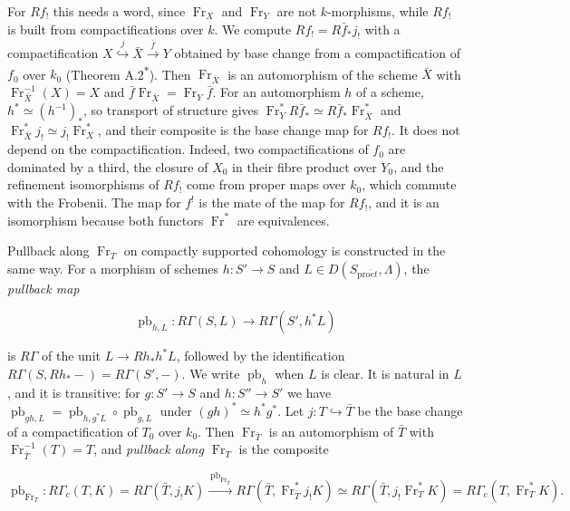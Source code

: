 \documentclass[11pt]{article}
\newcommand{\bpout}[1]{#1\textsuperscript{\hyperlink{bp-outside}{\ensuremath{\ast}}}}
\begin{document}
For \(Rf_!\) this needs a word, since \(\operatorname{Fr}_X\) and \(\operatorname{Fr}_Y\) are not \(k\)-morphisms, while \(Rf_!\) is built from compactifications over \(k\). We compute \(Rf_!=R\bar f_*j_!\) with a compactification \(X\overset{j}{\hookrightarrow}\bar X\xrightarrow{\bar f}Y\) obtained by base change from a compactification of \(f_0\) over \(k_0\) (Theorem \bpout{A.2}). Then \(\operatorname{Fr}_{\bar X}\) is an automorphism of the scheme \(\bar X\) with \(\operatorname{Fr}_{\bar X}^{-1}(X)=X\) and \(\bar f\operatorname{Fr}_{\bar X}=\operatorname{Fr}_Y\bar f\). For an automorphism \(h\) of a scheme, \(h^*\simeq(h^{-1})_*\), so transport of structure gives \(\operatorname{Fr}_Y^*R\bar f_*\simeq R\bar f_*\operatorname{Fr}_{\bar X}^*\) and \(\operatorname{Fr}_{\bar X}^*j_!\simeq j_!\operatorname{Fr}_X^*\), and their composite is the base change map for \(Rf_!\). It does not depend on the compactification. Indeed, two compactifications of \(f_0\) are dominated by a third, the closure of \(X_0\) in their fibre product over \(Y_0\), and the refinement isomorphisms of \(Rf_!\) come from proper maps over \(k_0\), which commute with the Frobenii. The map for \(f^!\) is the mate of the map for \(Rf_!\), and it is an isomorphism because both functors \(\operatorname{Fr}^*\) are equivalences.

Pullback along \(\operatorname{Fr}_T\) on compactly supported cohomology is constructed in the same way. For a morphism of schemes \(h:S'\to S\) and \(L\in D(S_{\mathrm{pro}\acute{e}t},\Lambda)\), the \emph{pullback map}

\[
\operatorname{pb}_{h,L}:R\Gamma(S,L)\longrightarrow R\Gamma(S',h^*L)
\]

is \(R\Gamma\) of the unit \(L\to Rh_*h^*L\), followed by the identification \(R\Gamma(S,Rh_*-)=R\Gamma(S',-)\). We write \(\operatorname{pb}_h\) when \(L\) is clear. It is natural in \(L\), and it is transitive: for \(g:S'\to S\) and \(h:S''\to S'\) we have \(\operatorname{pb}_{gh,L}=\operatorname{pb}_{h,g^*L}\circ\operatorname{pb}_{g,L}\) under \((gh)^*\simeq h^*g^*\). Let \(j:T\hookrightarrow\bar T\) be the base change of a compactification of \(T_0\) over \(k_0\). Then \(\operatorname{Fr}_{\bar T}\) is an automorphism of \(\bar T\) with \(\operatorname{Fr}_{\bar T}^{-1}(T)=T\), and \emph{pullback along \(\operatorname{Fr}_T\)} is the composite

\[
\operatorname{pb}_{\operatorname{Fr}_T}:
R\Gamma_c(T,K)=R\Gamma(\bar T,j_!K)
\xrightarrow{\ \operatorname{pb}_{\operatorname{Fr}_{\bar T}}\ }
R\Gamma(\bar T,\operatorname{Fr}_{\bar T}^*j_!K)
\simeq R\Gamma(\bar T,j_!\operatorname{Fr}_T^*K)
=R\Gamma_c(T,\operatorname{Fr}_T^*K).
\]
\end{document}
